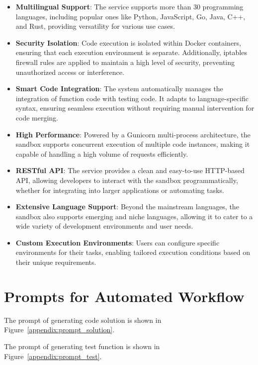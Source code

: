 \begin{itemize}
    \item \textbf{Multilingual Support}: The service supports more than 30 programming languages, including popular ones like Python, JavaScript, Go, Java, C++, and Rust, providing versatility for various use cases.
    \item \textbf{Security Isolation}: Code execution is isolated within Docker containers, ensuring that each execution environment is separate. Additionally, iptables firewall rules are applied to maintain a high level of security, preventing unauthorized access or interference.
    \item \textbf{Smart Code Integration}: The system automatically manages the integration of function code with testing code. It adapts to language-specific syntax, ensuring seamless execution without requiring manual intervention for code merging.
    \item \textbf{High Performance}: Powered by a Gunicorn multi-process architecture, the sandbox supports concurrent execution of multiple code instances, making it capable of handling a high volume of requests efficiently.
    \item \textbf{RESTful API}: The service provides a clean and easy-to-use HTTP-based API, allowing developers to interact with the sandbox programmatically, whether for integrating into larger applications or automating tasks.
    \item \textbf{Extensive Language Support}: Beyond the mainstream languages, the sandbox also supports emerging and niche languages, allowing it to cater to a wide variety of development environments and user needs.
    \item \textbf{Custom Execution Environments}: Users can configure specific environments for their tasks, enabling tailored execution conditions based on their unique requirements.
\end{itemize}







\section{Prompts for Automated Workflow}

The prompt of generating code solution is shown in Figure~\ref{appendix:prompt_solution}.

The prompt of generating test function is shown in Figure~\ref{appendix:prompt_test}.

